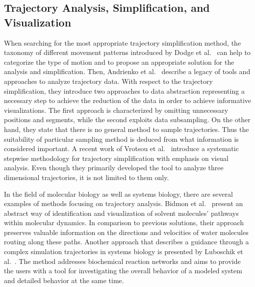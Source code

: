 \documentclass[twocolumn]{bmcart}%
\begin{document}
\subsection{Trajectory Analysis, Simplification, and Visualization}
When searching for the most appropriate trajectory simplification method, the taxonomy of different movement patterns introduced by Dodge et al.~\cite{Dodge2008} can help to categorize the type of motion and to propose an appropriate solution for the analysis and simplification.
Then, Andrienko et al.~\cite{andrienko2013} describe a legacy of tools and approaches to analyze trajectory data.
With respect to the trajectory simplification, they introduce two approaches to data abstraction representing a necessary step to achieve the reduction of the data in order to achieve informative visualizations.
The first approach is characterized by omitting unnecessary positions and segments, while the second exploits data subsampling.
On the other hand, they state that there is no general method to sample trajectories.
Thus the suitability of particular sampling method is deduced from what information is considered important.
A recent work of Vrotsou et al.~\cite{Vrotsou2015} introduce a systematic stepwise methodology for trajectory simplification with emphasis on visual analysis.
Even though they primarily developed the tool to analyze three dimensional trajectories, it is not limited to them only.

In the field of molecular biology as well as systems biology, there are several examples of methods focusing on trajectory analysis.
Bidmon et al.~\cite{bidmon2008} present an abstract way of identification and visualization of solvent molecules' pathways within molecular dynamics. 
In comparison to previous solutions, their approach preserves valuable information on the directions and velocities of water molecules routing along these paths. 
Another approach that describes a guidance through a complex simulation trajectories in systems biology is presented by Luboschik et al.~\cite{Luboschik2012}. 
The method addresses biochemical reaction networks and aims to provide the users with a tool for investigating the overall behavior of a modeled system and detailed behavior at the same time.
\end{document}
